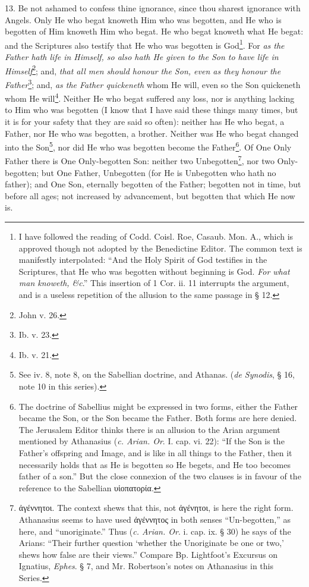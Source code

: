 13. Be not ashamed to confess thine ignorance, since thou sharest ignorance with Angels. Only He who begat knoweth Him who was begotten, and He who is begotten of Him knoweth Him who begat. He who begat knoweth what He begat: and the Scriptures also testify that He who was begotten is God\footnote{I have followed the reading of Codd. Coisl. Roe, Casaub. Mon. A., which is approved though not adopted by the Benedictine Editor. The common text is manifestly interpolated: “And the Holy Spirit of God testifies in the Scriptures, that He who was begotten without beginning is God. \emph{For what man knoweth, \&c}.” This insertion of 1 Cor. ii. 11 interrupts the argument, and is a useless repetition of the allusion to the same passage in § 12.}. For \emph{as the Father hath life in Himself, so also hath He given to the Son to have life in Himself}\footnote{John v. 26.}; and, \emph{that all men should honour the Son, even as they honour the Father}\footnote{Ib. v. 23.}; and, \emph{as the Father quickeneth} whom He will, even so the Son quickeneth whom He will\footnote{Ib. v. 21.}. Neither He who begat suffered any loss, nor is anything lacking to Him who was begotten (I know that I have said these things many times, but it is for your safety that they are said so often): neither has He who begat, a Father, nor He who was begotten, a brother. Neither was He who begat changed into the Son\footnote{See iv. 8, note 8, on the Sabellian doctrine, and Athanas. (\emph{de Synodis}, § 16, note 10 in this series).}, nor did He who was begotten become the Father\footnote{The doctrine of Sabellius might be expressed in two forms, either the Father became the Son, or the Son became the Father. Both forms are here denied. The Jerusalem Editor thinks there is an allusion to the Arian argument mentioned by Athanasius (\emph{c. Arian. Or}. I. cap. vi. 22): “If the Son is the Father’s offspring and Image, and is like in all things to the Father, then it necessarily holds that as He is begotten so He begets, and He too becomes father of a son.” But the close connexion of the two clauses is in favour of the reference to the Sabellian \textgreek{υἱοπατορία}.}. Of One Only Father there is One Only-begotten Son: neither two Unbegotten\footnote{\textgreek{ἀγέννητοι}. The context shews that this, not \textgreek{ἀγένητοι}, is here the right form. Athanasius seems to have used \textgreek{ἀγέννητος} in both senses “Un-begotten,” as here, and “unoriginate.” Thus (\emph{c. Arian. Or}. i. cap. ix. § 30) he says of the Arians: “Their further question ‘whether the Unoriginate be one or two,’ shews how false are their views.” Compare Bp. Lightfoot’s Excursus on Ignatius, \emph{Ephes}. § 7, and Mr. Robertson’s notes on Athanasius in this Series.}, nor two Only-begotten; but One Father, Unbegotten (for He is Unbegotten who hath no father); and One Son, eternally begotten of the Father; begotten not in time, but before all ages; not increased by advancement, but begotten that which He now is.

